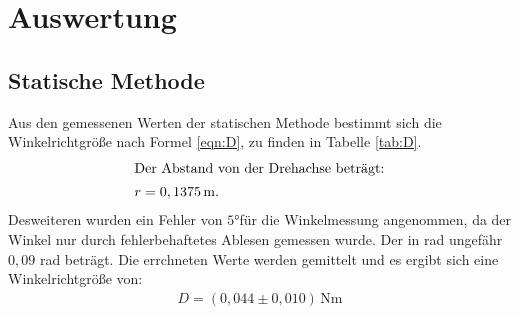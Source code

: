 \newpage
\section{Auswertung}
\label{sec:Auswertung}
\subsection{Statische Methode}
\label{sec:Statische}
Aus den gemessenen Werten der statischen Methode bestimmt sich die Winkelrichtgröße nach Formel \eqref{eqn:D}, zu finden in Tabelle \ref{tab:D}.
\begin{align}
\intertext{Der Abstand von der Drehachse beträgt:}
 r=0,1375\,\si{\meter}.
\end{align}
Desweiteren wurden ein Fehler von $5°$für die Winkelmessung angenommen, da der Winkel nur durch fehlerbehaftetes Ablesen gemessen wurde.
Der in rad ungefähr $0,09$ rad beträgt.
Die errchneten Werte werden gemittelt und es ergibt sich eine Winkelrichtgröße von:
\begin{align}
  D=(0,044\pm0,010)\,\si{\newton\meter}
\end{align}


